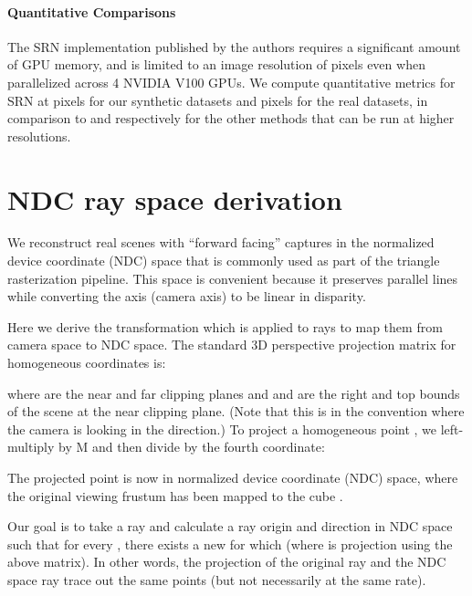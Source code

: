 \documentclass[runningheads]{llncs}
\begin{document}
\paragraph{\textbf{Quantitative Comparisons}} The SRN implementation published by the authors requires a significant amount of GPU memory, and is limited to an image resolution of  pixels even when parallelized across 4 NVIDIA V100 GPUs. We compute quantitative metrics for SRN at  pixels for our synthetic datasets and  pixels for the real datasets, in comparison to  and  respectively for the other methods that can be run at higher resolutions.


\section{NDC ray space derivation}

We reconstruct real scenes with ``forward facing'' captures in the normalized device coordinate (NDC) space that is commonly used as part of the triangle rasterization pipeline. This space is convenient because it preserves parallel lines while converting the  axis (camera axis) to be linear in disparity.

Here we derive the transformation which is applied to rays to map them from camera space to NDC space. The standard 3D perspective projection matrix for homogeneous coordinates is:

where  are the near and far clipping planes and  and  are the right and top bounds of the scene at the near clipping plane. (Note that this is in the convention where the camera is looking in the  direction.) To project a homogeneous point , we left-multiply by M and then divide by the fourth coordinate:

The projected point is now in normalized device coordinate (NDC) space, where the original viewing frustum has been mapped to the cube . 

Our goal is to take a ray  and calculate a ray origin  and direction  in NDC space such that for every , there exists a new  for which  (where  is projection using the above matrix). In other words, the projection of the original ray and the NDC space ray trace out the same points (but not necessarily at the same rate). 
\end{document}
